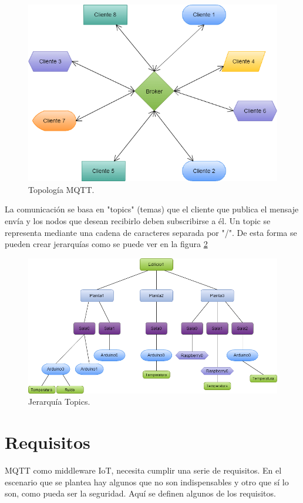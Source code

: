 \documentclass[12pt, twoside]{book}
\begin{document}
\begin{figure}[h!]
\centering
\includegraphics[scale=0.3]{images/topologia.png}
\caption{Topología MQTT.}\label{L401}
\end{figure}
\newpage
La comunicación se basa en "topics" (temas) que el cliente que publica el mensaje envía y los nodos que desean recibirlo deben subscribirse a él. Un topic se representa mediante una cadena de caracteres separada por "/". De esta forma se pueden crear jerarquías como se puede ver en la figura \ref{L402} \\ 
\begin{figure}[h!]
\centering
\includegraphics[scale=0.3]{images/jerarquia.png}
\caption{Jerarquía Topics.}\label{L402}
\end{figure}

\section{Requisitos}
MQTT como middleware IoT, necesita cumplir una serie de requisitos. En el escenario que se plantea hay algunos que no son indispensables y otro que sí lo son, como pueda ser la seguridad. Aquí se definen algunos de los requisitos.
\end{document}
